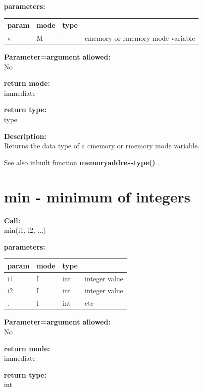         {\bf parameters:} \\
        \begin{tabular}{| l | l | l | l |}
        \hline
        param  & mode & type & \\
        \hline \hline
        v & M & - & cmemory or rmemory mode variable \\ \hline
        \end{tabular}
        
        {\bf Parameter=argument allowed:} \\
        No
        
        {\bf return mode:} \\
        immediate

        {\bf return type:} \\
        type
        
        {\bf Description:} \\
        Returns the data type of a cmemory or rmemory mode variable.

        See also inbuilt function
        {\bf memoryaddresstype()} .



    \section{min - minimum of integers}\label{sec:ifmin}
        
        
        {\bf Call:} \\
        min(i1, i2, ...)
        
        {\bf parameters:} \\
        \begin{tabular}{| l | l | l | l |}
        \hline
        param  & mode & type & \\
        \hline \hline
        i1 & I & int & integer value    \\ \hline
        i2 & I & int & integer value    \\ \hline
        .  & I & int & etc              \\ \hline
        \end{tabular}
        
        {\bf Parameter=argument allowed:} \\
        No
        
        {\bf return mode:} \\
        immediate

        {\bf return type:} \\
        int
        
